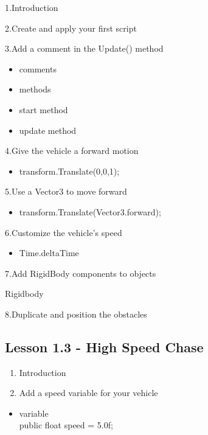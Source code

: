\documentclass[
]{book}
\providecommand{\tightlist}{%
  \setlength{\itemsep}{0pt}\setlength{\parskip}{0pt}}
\begin{document}
1.Introduction

2.Create and apply your first script

3.Add a comment in the Update() method

\begin{itemize}
\tightlist
\item
  comments
\item
  methods
\item
  start method
\item
  update method
\end{itemize}

4.Give the vehicle a forward motion

\begin{itemize}
\tightlist
\item
  transform.Translate(0,0,1);
\end{itemize}

5.Use a Vector3 to move forward

\begin{itemize}
\tightlist
\item
  transform.Translate(Vector3.forward);
\end{itemize}

6.Customize the vehicle's speed

\begin{itemize}
\tightlist
\item
  Time.deltaTime
\end{itemize}

7.Add RigidBody components to objects

Rigidbody

8.Duplicate and position the obstacles

\hypertarget{lesson-1.3---high-speed-chase}{%
\subsection{Lesson 1.3 - High Speed Chase}\label{lesson-1.3---high-speed-chase}}

\begin{enumerate}
\def\labelenumi{\arabic{enumi}.}
\item
  Introduction
\item
  Add a speed variable for your vehicle
\end{enumerate}

\begin{itemize}
\tightlist
\item
  variable\\
  public float speed = 5.0f;
\end{itemize}
\end{document}
